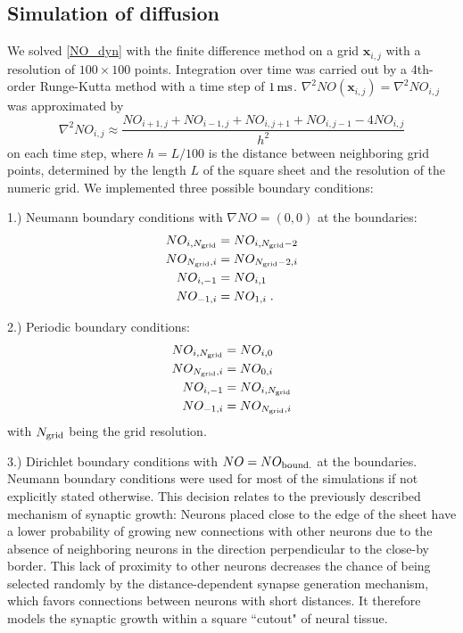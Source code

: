 \documentclass[10pt,letterpaper]{article}
\begin{document}
\subsection*{Simulation of diffusion}
We solved \eqref{NO_dyn} with the finite difference method on a grid $\mathbf{x}_{i,j}$ with a resolution of $100\times 100$ points. Integration over time was carried out by a 4th-order Runge-Kutta method with a time step of $\rm 1\, ms$. $\nabla^2 NO(\mathbf{x}_{i,j}) = \nabla^2 NO_{i,j}$ was approximated by
\begin{equation}
\nabla^2 NO_{i,j} \approx \frac{NO_{i+1,j}+NO_{i-1,j}+NO_{i,j+1}+NO_{i,j-1}-4NO_{i,j}}{h^2}
\label{Laplace_Numeric}
\end{equation}
on each time step, where $h = L/100$ is the distance between neighboring grid points, determined by the length $L$ of the square sheet and the resolution of the numeric grid. We implemented three possible boundary conditions:

1.) Neumann boundary conditions with $\nabla NO = (0,0)$ at the boundaries:
\begin{align}
NO_{i,N_{\rm grid}} &= NO_{i,N_{\rm grid}-2} \label{Neumann_Cond_1} \\
NO_{N_{\rm grid},i} &= NO_{N_{\rm grid}-2,i} \label{Neumann_Cond_2} \\
NO_{i,-1} &= NO_{i,1} \label{Neumann_Cond_3} \\
NO_{-1,i} &= NO_{1,i} \; . \label{Neumann_Cond_4}
\end{align}

2.) Periodic boundary conditions:
\begin{align}
NO_{i,N_{\rm grid}} &= NO_{i,0} \label{Periodic_Cond_1} \\
NO_{N_{\rm grid},i} &= NO_{0,i} \label{Periodic_Cond_2} \\
NO_{i,-1} &= NO_{i,N_{\rm grid}} \label{Periodic_Cond_3} \\
NO_{-1,i} &= NO_{N_{\rm grid},i} \label{Periodic_Cond_4}
\end{align}
with $N_{\rm grid}$ being the grid resolution.

3.) Dirichlet boundary conditions with $NO = NO_{\rm bound.}$ at the boundaries.\\
Neumann boundary conditions were used for most of the simulations if not explicitly stated otherwise. This decision relates to the previously described mechanism of synaptic growth: Neurons placed close to the edge of the sheet have a lower probability of growing new connections with other neurons due to the absence of neighboring neurons in the direction perpendicular to the close-by border. This lack of proximity to other neurons decreases the chance of being selected randomly by the distance-dependent synapse generation mechanism, which favors connections between neurons with short distances. It therefore models the synaptic growth within a square ``cutout" of neural tissue.
\end{document}
